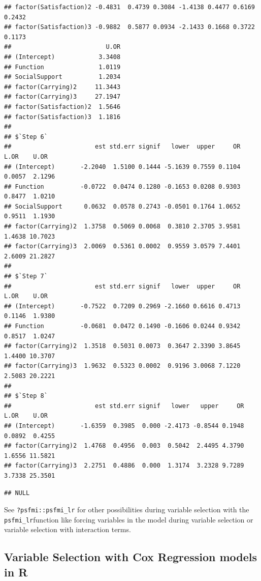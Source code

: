 \documentclass[
]{book}
\newenvironment{Shaded}{\begin{snugshade}}{\end{snugshade}}
\newcommand{\NormalTok}[1]{#1}
\newcommand{\OperatorTok}[1]{\textcolor[rgb]{0.81,0.36,0.00}{\textbf{#1}}}
\begin{document}
\begin{verbatim}
## factor(Satisfaction)2 -0.4831  0.4739 0.3084 -1.4138 0.4477 0.6169 0.2432
## factor(Satisfaction)3 -0.9882  0.5877 0.0934 -2.1433 0.1668 0.3722 0.1173
##                          U.OR
## (Intercept)            3.3408
## Function               1.0119
## SocialSupport          1.2034
## factor(Carrying)2     11.3443
## factor(Carrying)3     27.1947
## factor(Satisfaction)2  1.5646
## factor(Satisfaction)3  1.1816
## 
## $`Step 6`
##                       est std.err signif   lower  upper     OR   L.OR    U.OR
## (Intercept)       -2.2040  1.5100 0.1444 -5.1639 0.7559 0.1104 0.0057  2.1296
## Function          -0.0722  0.0474 0.1280 -0.1653 0.0208 0.9303 0.8477  1.0210
## SocialSupport      0.0632  0.0578 0.2743 -0.0501 0.1764 1.0652 0.9511  1.1930
## factor(Carrying)2  1.3758  0.5069 0.0068  0.3810 2.3705 3.9581 1.4638 10.7023
## factor(Carrying)3  2.0069  0.5361 0.0002  0.9559 3.0579 7.4401 2.6009 21.2827
## 
## $`Step 7`
##                       est std.err signif   lower  upper     OR   L.OR    U.OR
## (Intercept)       -0.7522  0.7209 0.2969 -2.1660 0.6616 0.4713 0.1146  1.9380
## Function          -0.0681  0.0472 0.1490 -0.1606 0.0244 0.9342 0.8517  1.0247
## factor(Carrying)2  1.3518  0.5031 0.0073  0.3647 2.3390 3.8645 1.4400 10.3707
## factor(Carrying)3  1.9632  0.5323 0.0002  0.9196 3.0068 7.1220 2.5083 20.2221
## 
## $`Step 8`
##                       est std.err signif   lower   upper     OR   L.OR    U.OR
## (Intercept)       -1.6359  0.3985  0.000 -2.4173 -0.8544 0.1948 0.0892  0.4255
## factor(Carrying)2  1.4768  0.4956  0.003  0.5042  2.4495 4.3790 1.6556 11.5821
## factor(Carrying)3  2.2751  0.4886  0.000  1.3174  3.2328 9.7289 3.7338 25.3501
\end{verbatim}

\begin{Shaded}
\end{Shaded}

\begin{verbatim}
## NULL
\end{verbatim}

See \texttt{?psfmi::psfmi\_lr} for other possibilities during variable selection with the \texttt{psfmi\_lr}function like forcing variables in the model during variable selection or variable selection with interaction terms.

\hypertarget{variable-selection-with-cox-regression-models-in-r}{%
\subsection{Variable Selection with Cox Regression models in R}\label{variable-selection-with-cox-regression-models-in-r}}
\end{document}
